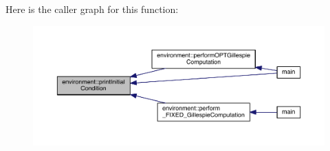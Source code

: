 Here is the caller graph for this function\-:
\nopagebreak
\begin{figure}[H]
\begin{center}
\leavevmode
\includegraphics[width=350pt]{a00014_a429c2529badaeda72e553f500b990e11_icgraph}
\end{center}
\end{figure}


